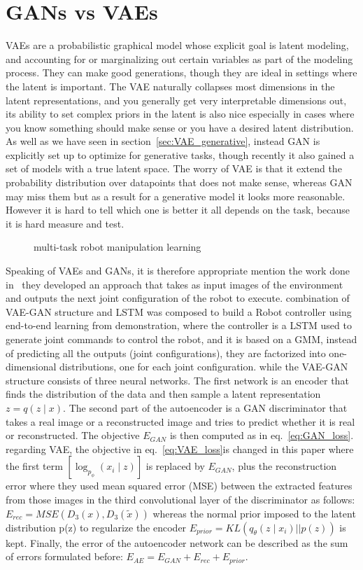 \section{GANs vs VAEs}
\label{sec:GAN-VAEs}
VAEs are a probabilistic graphical model whose explicit goal is latent modeling, and accounting for or marginalizing out certain variables as part of the modeling process. They can make good generations, though they are ideal in settings where the latent is important. The VAE naturally collapses most dimensions in the latent representations, and you generally get very interpretable dimensions out, its ability to set complex priors in the latent is also nice especially in cases where you know something should make sense or you have a desired latent distribution. As well as we have seen in section~\ref{sec:VAE_generative}, instead GAN is explicitly set up to optimize for generative tasks, though recently it also gained a set of models with a true latent space. The worry of VAE is that it extend the probability distribution over datapoints that does not make sense, whereas GAN may miss them but as a result for a generative model it looks more reasonable. However it is hard to tell which one is better it all depends on the task, because it is hard measure and test.
\begin{figure}
	\centerline
	\VAEGAN
	\caption{multi-task robot manipulation learning}
	\label{fig:VAEGAN}
\end{figure} Speaking of VAEs and GANs, it is therefore appropriate mention the work done in~\cite{rahmatizadeh2018vision} they developed an approach that takes as input images of the environment and outputs the next joint configuration of the robot to execute. combination of VAE-GAN structure and LSTM was composed to build a Robot controller using end-to-end learning from demonstration, where the controller is a LSTM used to generate joint commands to control the robot, and it is based on a GMM, instead of predicting all the outputs (joint configurations), they are factorized into one-dimensional distributions, one for each joint configuration. while the VAE-GAN structure consists of three neural networks. The first network is an encoder that finds the distribution of the data and then sample a latent representation $z=q(z\mid x)$. The second part of the autoencoder is a GAN discriminator that takes a real image or a reconstructed image and tries to predict whether it is real or reconstructed. The objective $E_{GAN}$ is then computed as in eq.~\ref{eq:GAN_loss}. regarding VAE, the objective in eq.~\ref{eq:VAE_loss}is changed  in this paper where the first term $[\log_{p_\phi}(x_i \mid z)]$ is replaced by $E_{GAN}$, plus the reconstruction error where they used mean squared error (MSE) between the extracted features from those images in the third convolutional layer of the discriminator as follows: $E_{rec} = MSE(D_3(x), D_3(\tilde{x} ))$ whereas the normal prior imposed to the latent distribution p(z) to regularize the encoder $E_{prior}=KL(q_\theta (z\mid x_i)||p(z))$ is kept. Finally, the error of the autoencoder network can be described as the sum of errors formulated before: $E_{AE} = E_{GAN}+ E_{rec} + E_{prior}$.\\ 
